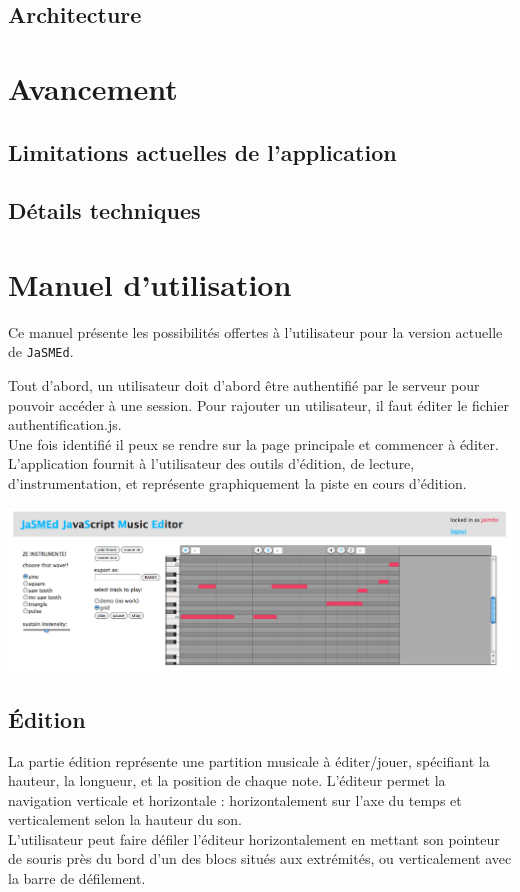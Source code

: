 \documentclass[pdftex,12pt,a4paper]{article}
\newcommand{\jasmed}{\texttt{JaSMEd}}
\begin{document}
\subsection{Architecture}

\section{Avancement}

\subsection{Limitations actuelles de l’application}

\subsection{Détails techniques}

\section{Manuel d'utilisation}

Ce manuel présente les possibilités offertes à l'utilisateur pour la version actuelle de \jasmed.

Tout d'abord, un utilisateur doit d'abord être authentifié par le serveur pour pouvoir accéder à une session.
Pour rajouter un utilisateur, il faut éditer le fichier authentification.js.\\
Une fois identifié il peux se rendre sur la page principale et commencer à éditer.\\
L'application fournit à l'utilisateur des outils d'édition, de lecture,  d'instrumentation, et représente graphiquement la piste en cours d'édition.

\includegraphics[width= \linewidth]{./track}

\subsection{Édition}
La partie édition représente une partition musicale à éditer/jouer, spécifiant la hauteur, la longueur, et la position de chaque note. L'éditeur permet la navigation verticale et horizontale : horizontalement sur l'axe du temps et verticalement selon la hauteur du son.\\
L'utilisateur peut faire défiler l'éditeur horizontalement en mettant son pointeur de souris près du bord d'un des blocs situés aux extrémités, ou verticalement avec la barre de défilement.
\end{document}
